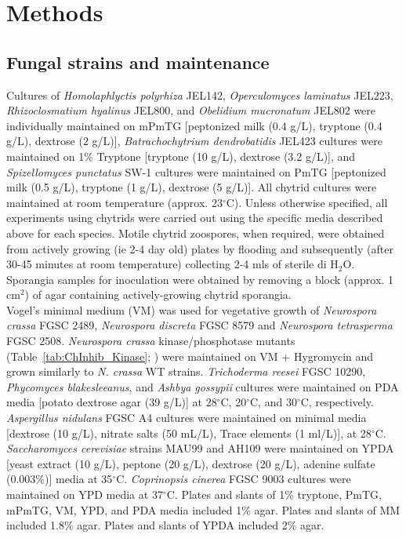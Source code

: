 \section{Methods}
\subsection*{Fungal strains and maintenance}
Cultures of \textit{Homolaphlyctis polyrhiza} JEL142, \textit{Operculomyces laminatus} JEL223, \textit{Rhizoclosmatium hyalinus} JEL800, and \textit{Obelidium mucronatum} JEL802 were individually maintained on mPmTG [peptonized milk (0.4 g/L), tryptone (0.4 g/L), dextrose (2 g/L)], \textit{Batrachochytrium dendrobatidis} JEL423 cultures were maintained on 1\% Tryptone [tryptone (10 g/L), dextrose (3.2 g/L)], and \textit{Spizellomyces punctatus} SW-1 cultures were maintained on PmTG [peptonized milk (0.5 g/L), tryptone (1 g/L), dextrose (5 g/L)]. All chytrid cultures were maintained at room temperature (approx. 23$^{\circ}$C). Unless otherwise specified, all experiments using chytrids were carried out using the specific media described above for each species. Motile chytrid zoospores, when required, were obtained from actively growing (ie 2-4 day old) plates by flooding and subsequently (after 30-45 minutes at room temperature) collecting 2-4 mls of sterile di H$_{2}$O. Sporangia samples for inoculation were obtained by removing a block (approx. 1 cm$^{2}$) of agar containing actively-growing chytrid sporangia.\\
\indent Vogel's minimal medium (VM) \cite{Davis1970} was used for vegetative growth of \textit{Neurospora crassa} FGSC 2489, \textit{Neurospora discreta} FGSC 8579 and \textit{Neurospora tetrasperma} FGSC 2508. \textit{Neurospora crassa} kinase/phosphotase mutants (Table~\ref{tab:ChInhib_Kinase}; \cite{Park2011}) were maintained on VM + Hygromycin and grown similarly to \textit{N. crassa} WT strains. \textit{Trichoderma reesei} FGSC 10290, \textit{Phycomyces blakesleeanus}, and \textit{Ashbya gossypii} cultures were maintained on PDA media [potato dextrose agar (39 g/L)] at 28$^{\circ}$C, 20$^{\circ}$C, and 30$^{\circ}$C, respectively. \textit{Aspergillus nidulans} FGSC A4 cultures were maintained on minimal media [dextrose (10 g/L), nitrate salts (50 mL/L), Trace elements (1 ml/L)], at 28$^{\circ}$C. \textit{Saccharomyces cerevisiae} strains MAU99 and AH109 were maintained on YPDA [yeast extract (10 g/L), peptone (20 g/L), dextrose (20 g/L), adenine sulfate (0.003\%)] media at 35$^{\circ}$C. \textit{Coprinopsis cinerea} FGSC 9003 cultures were maintained on YPD media at 37$^{\circ}$C.  Plates and slants of 1\% tryptone, PmTG, mPmTG, VM, YPD, and PDA media included 1\% agar. Plates and slants of MM included 1.8\% agar. Plates and slants of YPDA included 2\% agar.\\
